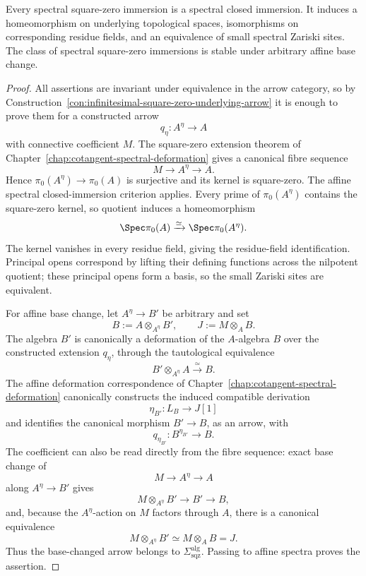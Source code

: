 \begin{proposition}
\label{prop:infinitesimal-square-zero-properties}
Every spectral square-zero immersion is a spectral closed immersion.  It
induces a homeomorphism on underlying topological spaces, isomorphisms on
corresponding residue fields, and an equivalence of small spectral Zariski
sites.  The class of spectral square-zero immersions is stable under arbitrary
affine base change.
\end{proposition}

\begin{proof}
All assertions are invariant under equivalence in the arrow category, so by
Construction~\ref{con:infinitesimal-square-zero-underlying-arrow} it is enough
to prove them for a constructed arrow
\[
    q_\eta:A^\eta\longrightarrow A
\]
with connective coefficient \(M\).  The square-zero extension theorem of
Chapter~\ref{chap:cotangent-spectral-deformation} gives a canonical fibre
sequence
\[
    M\longrightarrow A^\eta\longrightarrow A.
\]
Hence $\pi_0(A^\eta)\to\pi_0(A)$ is surjective and its kernel is square-zero.
The affine spectral closed-immersion criterion applies.  Every prime of
$\pi_0(A^\eta)$ contains the square-zero kernel, so quotient induces a
homeomorphism
\[
    \Spec\pi_0(A)\xrightarrow{\simeq}\Spec\pi_0(A^\eta).
\]
The kernel vanishes in every residue field, giving the residue-field
identification.  Principal opens correspond by lifting their defining
functions across the nilpotent quotient; these principal opens form a basis,
so the small Zariski sites are equivalent.

For affine base change, let $A^\eta\to B'$ be arbitrary and set
\[
    B:=A\otimes_{A^\eta}B',
    \qquad
    J:=M\otimes_AB.
\]
The algebra $B'$ is canonically a deformation of the $A$-algebra $B$ over the
constructed extension $q_\eta$, through the tautological equivalence
\[
    B'\otimes_{A^\eta}A\xrightarrow{\simeq}B.
\]
The affine deformation correspondence of
Chapter~\ref{chap:cotangent-spectral-deformation} canonically constructs the
induced compatible derivation
\[
    \eta_{B'}:L_B\longrightarrow J[1]
\]
and identifies the canonical morphism $B'\to B$, as an arrow, with
\[
    q_{\eta_{B'}}:B^{\eta_{B'}}\longrightarrow B.
\]
The coefficient can also be read directly from the fibre sequence: exact base
change of
\[
    M\longrightarrow A^\eta\longrightarrow A
\]
along $A^\eta\to B'$ gives
\[
    M\otimes_{A^\eta}B'\longrightarrow B'\longrightarrow B,
\]
and, because the $A^\eta$-action on $M$ factors through $A$, there is a
canonical equivalence
\[
    M\otimes_{A^\eta}B'\simeq M\otimes_AB=J.
\]
Thus the base-changed arrow belongs to
\(\Sigma_{\mathrm{sqz}}^{\mathrm{alg}}\).  Passing to affine spectra proves
the assertion.
\end{proof}

